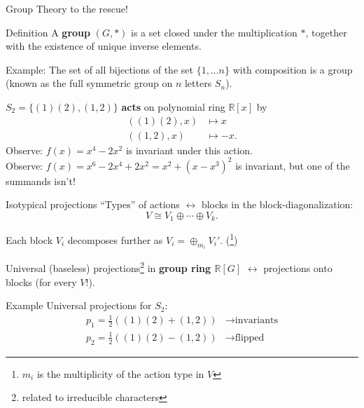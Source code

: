 \begin{frame}{Group Theory to the rescue!}
  \begin{block}{Definition}
    A \textbf{group} $(G, *)$ is a set closed under the multiplication $*$, together with the existence of unique inverse elements.
  \end{block}
    {\small Example: The set of all bijections of the set $\{1,\ldots n\}$ with composition is a group (known as the full symmetric group on $n$ letters $S_n$).}
    
    $S_2 = \{(1)(2), (1,2)\}$ \textbf{acts} on polynomial ring $\mathbb{R}[x]$ by
    \begin{align*}
      ((1)(2), x) & \mapsto x\\
      ((1, 2), x) & \mapsto -x.
    \end{align*}
    {\small Observe: $f(x) = x^4 - 2x^2$ is invariant under this action.\\
    Observe: $f(x) = x^6 - 2x^4 + 2x^2 = x^2 + (x-x^3)^2$ is invariant, but one of the summands isn't!}
    
\end{frame}


\begin{frame}{Isotypical projections}
    ``Types'' of actions $\leftrightarrow$  blocks in the block-diagonalization:
    \[V \cong V_1 \oplus \cdots \oplus V_k.\]
    
    Each block $V_i$ decomposes further as 
    $V_i = \oplus_{m_i} V_i'$. (\footnote{$m_i$ is the multiplicity of the action type in $V$})
    
    Universal (baseless) projections\footnote{related to irreducible characters} in \textbf{group ring $\mathbb{R}[G]$} $\leftrightarrow$ projections onto blocks (for every $V$!).
%     
    \begin{block}{Example}
    \small
    Universal projections for $S_2$:\\[-0.2in]
    \begin{align*}
      p_1 = \frac{1}{2}((1)(2) + (1,2)) & \to\text{invariants}\\ 
      p_2 = \frac{1}{2}((1)(2) - (1,2)) & \to\text{flipped}
    \end{align*}
    \end{block}
    
\end{frame}

